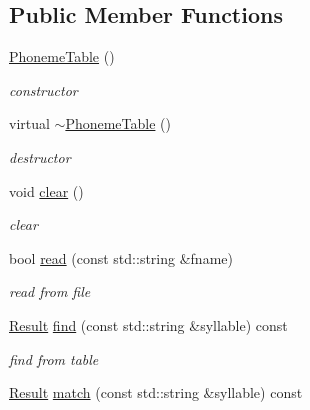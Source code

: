 \subsection*{\-Public \-Member \-Functions}
\begin{DoxyCompactItemize}
\item 
\hypertarget{classsinsy_1_1PhonemeTable_ad6196b694f8d9619db3b6740fb5cc078}{\hyperlink{classsinsy_1_1PhonemeTable_ad6196b694f8d9619db3b6740fb5cc078}{\-Phoneme\-Table} ()}\label{classsinsy_1_1PhonemeTable_ad6196b694f8d9619db3b6740fb5cc078}

\begin{DoxyCompactList}\small\item\em constructor \end{DoxyCompactList}\item 
\hypertarget{classsinsy_1_1PhonemeTable_af0246578a0f10da444660cee9d818847}{virtual \hyperlink{classsinsy_1_1PhonemeTable_af0246578a0f10da444660cee9d818847}{$\sim$\-Phoneme\-Table} ()}\label{classsinsy_1_1PhonemeTable_af0246578a0f10da444660cee9d818847}

\begin{DoxyCompactList}\small\item\em destructor \end{DoxyCompactList}\item 
\hypertarget{classsinsy_1_1PhonemeTable_a02aef46eefd737a0e3b1d71705a17e69}{void \hyperlink{classsinsy_1_1PhonemeTable_a02aef46eefd737a0e3b1d71705a17e69}{clear} ()}\label{classsinsy_1_1PhonemeTable_a02aef46eefd737a0e3b1d71705a17e69}

\begin{DoxyCompactList}\small\item\em clear \end{DoxyCompactList}\item 
bool \hyperlink{classsinsy_1_1PhonemeTable_a0dc8c944af15b4c243aa72115f1dee00}{read} (const std\-::string \&fname)
\begin{DoxyCompactList}\small\item\em read from file \end{DoxyCompactList}\item 
\hypertarget{classsinsy_1_1PhonemeTable_a566aaa82dd63d3421953bf65a14c0a60}{\hyperlink{classsinsy_1_1PhonemeTable_1_1Result}{\-Result} \hyperlink{classsinsy_1_1PhonemeTable_a566aaa82dd63d3421953bf65a14c0a60}{find} (const std\-::string \&syllable) const }\label{classsinsy_1_1PhonemeTable_a566aaa82dd63d3421953bf65a14c0a60}

\begin{DoxyCompactList}\small\item\em find from table \end{DoxyCompactList}\item 
\hypertarget{classsinsy_1_1PhonemeTable_afc13b7b07dece677b7efa0402ba0cee3}{\hyperlink{classsinsy_1_1PhonemeTable_1_1Result}{\-Result} \hyperlink{classsinsy_1_1PhonemeTable_afc13b7b07dece677b7efa0402ba0cee3}{match} (const std\-::string \&syllable) const }\label{classsinsy_1_1PhonemeTable_afc13b7b07dece677b7efa0402ba0cee3}


\end{DoxyCompactItemize}

